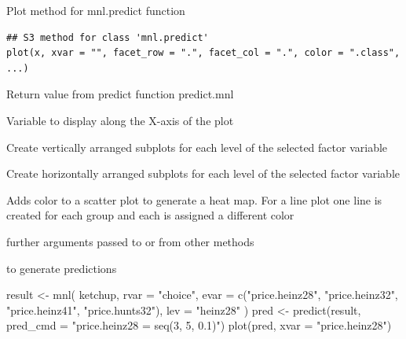 \documentclass[a4paper]{book}
\begin{document}
%
\begin{Description}
Plot method for mnl.predict function
\end{Description}
%
\begin{Usage}
\begin{verbatim}
## S3 method for class 'mnl.predict'
plot(x, xvar = "", facet_row = ".", facet_col = ".", color = ".class", ...)
\end{verbatim}
\end{Usage}
%
\begin{Arguments}
\begin{ldescription}
\item[\code{x}] Return value from predict function predict.mnl

\item[\code{xvar}] Variable to display along the X-axis of the plot

\item[\code{facet\_row}] Create vertically arranged subplots for each level of the selected factor variable

\item[\code{facet\_col}] Create horizontally arranged subplots for each level of the selected factor variable

\item[\code{color}] Adds color to a scatter plot to generate a heat map. For a line plot one line is created for each group and each is assigned a different color

\item[\code{...}] further arguments passed to or from other methods
\end{ldescription}
\end{Arguments}
%
\begin{SeeAlso}
 to generate predictions
\end{SeeAlso}
%
\begin{Examples}
\begin{ExampleCode}
result <- mnl(
  ketchup,
  rvar = "choice",
  evar = c("price.heinz28", "price.heinz32", "price.heinz41", "price.hunts32"),
  lev = "heinz28"
)
pred <- predict(result, pred_cmd = "price.heinz28 = seq(3, 5, 0.1)")
plot(pred, xvar = "price.heinz28")

\end{ExampleCode}
\end{Examples}
\end{document}
